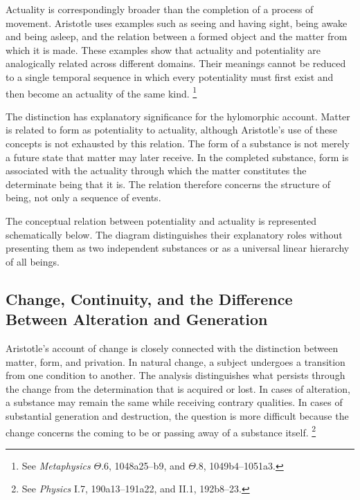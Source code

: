 \label{para:VS.B01.P01.C08.S05.SS07.P003}

Actuality is correspondingly broader than the
completion of a process of movement. Aristotle
uses examples such as seeing and having sight,
being awake and being asleep, and the relation
between a formed object and the matter from
which it is made. These examples show that
actuality and potentiality are analogically
related across different domains. Their meanings
cannot be reduced to a single temporal sequence
in which every potentiality must first exist
and then become an actuality of the same kind.
\footnote{See \textit{Metaphysics} $\Theta$.6,
1048a25--b9, and $\Theta$.8, 1049b4--1051a3.}

\label{para:VS.B01.P01.C08.S05.SS07.P004}

The distinction has explanatory significance
for the hylomorphic account. Matter is related
to form as potentiality to actuality, although
Aristotle's use of these concepts is not exhausted
by this relation. The form of a substance is
not merely a future state that matter may later
receive. In the completed substance, form is
associated with the actuality through which
the matter constitutes the determinate being
that it is. The relation therefore concerns
the structure of being, not only a sequence
of events.

\label{para:VS.B01.P01.C08.S05.SS07.P005}

The conceptual relation between potentiality
and actuality is represented schematically below.
The diagram distinguishes their explanatory
roles without presenting them as two independent
substances or as a universal linear hierarchy
of all beings.




\subsection{Change, Continuity, and the Difference Between Alteration and Generation}

\label{para:VS.B01.P01.C08.S05.SS08.P001}

Aristotle's account of change is closely connected
with the distinction between matter, form, and
privation. In natural change, a subject undergoes
a transition from one condition to another.
The analysis distinguishes what persists through
the change from the determination that is acquired
or lost. In cases of alteration, a substance may
remain the same while receiving contrary qualities.
In cases of substantial generation and destruction,
the question is more difficult because the change
concerns the coming to be or passing away of a
substance itself. \footnote{See \textit{Physics}
I.7, 190a13--191a22, and II.1, 192b8--23.}

